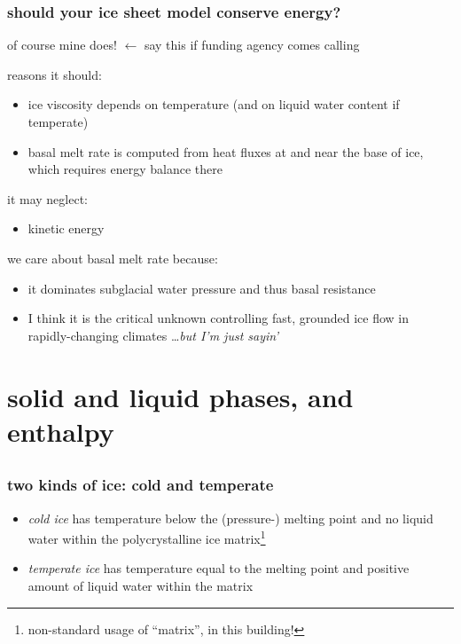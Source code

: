 \documentclass{beamer}
\begin{document}
\begin{frame}
  \frametitle{should your ice sheet model conserve energy?}

\alert{of course mine does!}  \qquad $\longleftarrow$ \scriptsize say this if funding agency comes calling\normalsize

\bigskip
reasons it should:
\begin{itemize}
\small
\item ice viscosity depends on temperature (and on liquid water content if temperate)
\item basal melt rate is computed from heat fluxes at and near the base of ice, which requires energy balance there
\end{itemize}

\bigskip
it may neglect:
\begin{itemize}
\small
\item kinetic energy
\end{itemize}

\bigskip
we care about basal melt rate because:
\begin{itemize}
\small
\item it dominates subglacial water pressure and thus basal resistance
\item I think it is the critical unknown controlling fast, grounded ice flow in rapidly-changing climates \dots \emph{but I'm just sayin'}
\end{itemize}

\end{frame}


\section[enthalpy]{solid and liquid phases, and enthalpy}\subsection*{}

\begin{frame}
  \frametitle{two kinds of ice: cold and temperate}

\begin{itemize}
\item \emph{cold ice} has temperature below the (pressure-) melting point and no liquid water within the polycrystalline ice matrix\footnote{non-standard usage of ``matrix'', in this building!}
\item \emph{temperate ice} has temperature equal to the melting point and positive amount of liquid water within the matrix
\end{itemize}

\end{frame}
\end{document}
